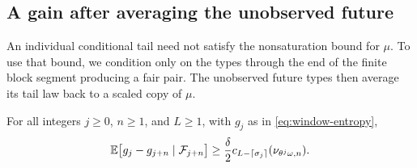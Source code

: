 \subsection{A gain after averaging the unobserved future}

An individual conditional tail need not satisfy the nonsaturation bound
for $\mu$.  To use that bound, we condition only on the types through
the end of the finite block segment producing a fair pair.  The
unobserved future types then average its tail law back to a scaled copy
of $\mu$.

\begin{lemma}\label{lem:conditional-gain}
For all integers $j\ge0$, $n\ge1$, and $L\ge1$, with $g_j$ as in
\eqref{eq:window-entropy},
\begin{equation}\label{eq:conditional-gain}
 \mathbb E\bigl[g_j-g_{j+n}\mid\mathcal F_{j+n}\bigr]
 \ge \frac{\delta}{2}
 c_{L-\lceil\sigma_j\rceil}(\nu_{\theta^j\omega,n}).
\end{equation}
\end{lemma}


